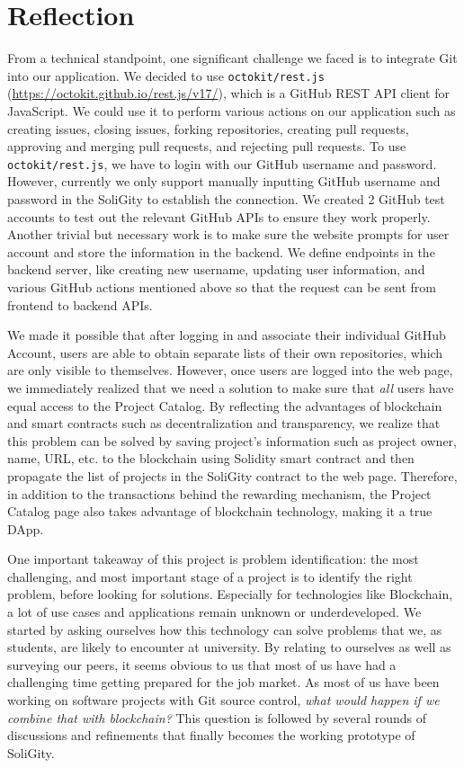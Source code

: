 \documentclass[12pt]{article}
\renewcommand{\_}{\kern-1.5pt\textunderscore\kern-1.5pt}
\begin{document}
\renewcommand\thesection{\arabic{section}}
\renewcommand\thesubsection{\thesection.\arabic{subsection}}

\section{Reflection}

From a technical standpoint, one significant challenge we faced is to integrate Git into our application. We decided to use \texttt{octokit/rest.js} (\url{https://octokit.github.io/rest.js/v17/}), which is a GitHub REST API client for
JavaScript. We could use it to perform various actions on our application such as creating issues, closing issues,
forking repositories, creating pull requests, approving and merging pull requests, and rejecting pull requests.
To use \texttt{octokit/rest.js}, we have to login with our GitHub username and password. However, currently we only
support manually inputting GitHub username and password in the SoliGity to establish the connection. We created
2 GitHub test accounts to test out the relevant GitHub APIs to ensure they work properly. Another trivial but
necessary work is to make sure the website prompts for user account and store the information in the backend.
We define endpoints in the backend server, like creating new username, updating user information, and various GitHub
actions mentioned above so that the request can be sent from frontend to backend APIs.

We made it possible that after logging in and associate their individual GitHub Account, users are able to obtain
separate lists of their own repositories, which are only visible to themselves. However, once users are logged
into the web page, we immediately realized that we need a solution to make sure that \textit{all} users have equal
access to the Project Catalog. By reflecting the advantages of blockchain and smart contracts such as decentralization
and transparency, we realize that this problem can be solved by saving project's information such as project owner,
name, URL, etc. to the blockchain using Solidity smart contract and then propagate the list of projects in the
SoliGity contract to the web page. Therefore, in addition to the transactions behind the rewarding mechanism,
the Project Catalog page also takes advantage of blockchain technology, making it a true DApp.

One important takeaway of this project is problem identification: the most challenging, and most important stage
of a project is to identify the right problem, before looking for solutions. Especially for technologies like
Blockchain, a lot of use cases and applications remain unknown or underdeveloped. We started by asking
ourselves how this technology can solve problems that we, as students, are likely to encounter at university.
By relating to ourselves as well as surveying our peers, it seems obvious to us that most of us have had a
challenging time getting prepared for the job market. As most of us have been working on software projects with
Git source control, \textit{what would happen if we combine that with blockchain?} This question is followed by
several rounds of discussions and refinements that finally becomes the working prototype of SoliGity.
\end{document}
